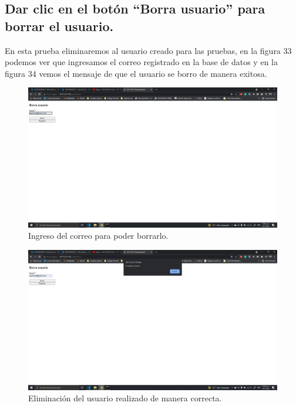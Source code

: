 \documentclass[11pt]{article}
\begin{document}
		\subsection{Dar clic en el botón ``Borra usuario'' para borrar el usuario.}
		En esta prueba eliminaremos al usuario creado para las pruebas, en la figura 33 podemos ver que ingresamos el correo registrado en la base de datos y en la figura 34 vemos el mensaje de que el usuario se borro de manera exitosa.
		\begin{figure}[H]
			\centering
			\includegraphics[scale=0.34]{resources/p9.8.png}
			\caption{Ingreso del correo para poder borrarlo.}\label{fig:picture}
		\end{figure}
		\begin{figure}[H]
			\centering
			\includegraphics[scale=0.34]{resources/p9.8.1.png}
			\caption{Eliminación del usuario realizado de manera correcta.}\label{fig:picture}
		\end{figure}
\end{document}
